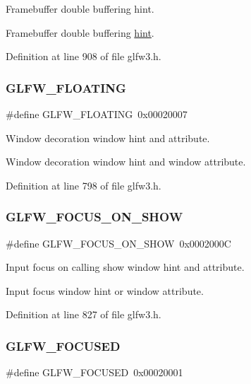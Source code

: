 Framebuffer double buffering hint. 

Framebuffer double buffering \mbox{\hyperlink{group__window_ga714a5d569e8a274ea58fdfa020955339}{hint}}. 

Definition at line 908 of file glfw3.\+h.

\mbox{\label{group__window_ga7fb0be51407783b41adbf5bec0b09d80}} 
\subsubsection{\texorpdfstring{GLFW\_FLOATING}{GLFW\_FLOATING}}
{\footnotesize\ttfamily \#define G\+L\+F\+W\+\_\+\+F\+L\+O\+A\+T\+I\+NG~0x00020007}



Window decoration window hint and attribute. 

Window decoration window hint and window attribute. 

Definition at line 798 of file glfw3.\+h.

\mbox{\label{group__window_gafa94b1da34bfd6488c0d709761504dfc}} 
\subsubsection{\texorpdfstring{GLFW\_FOCUS\_ON\_SHOW}{GLFW\_FOCUS\_ON\_SHOW}}
{\footnotesize\ttfamily \#define G\+L\+F\+W\+\_\+\+F\+O\+C\+U\+S\+\_\+\+O\+N\+\_\+\+S\+H\+OW~0x0002000C}



Input focus on calling show window hint and attribute. 

Input focus window hint or window attribute. 

Definition at line 827 of file glfw3.\+h.

\mbox{\label{group__window_ga54ddb14825a1541a56e22afb5f832a9e}} 
\subsubsection{\texorpdfstring{GLFW\_FOCUSED}{GLFW\_FOCUSED}}
{\footnotesize\ttfamily \#define G\+L\+F\+W\+\_\+\+F\+O\+C\+U\+S\+ED~0x00020001}



